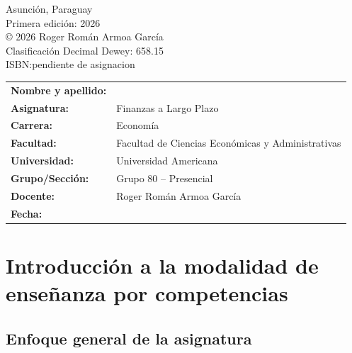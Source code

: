\documentclass[12pt,a4paper]{article}
\begin{document}
Asunción, Paraguay\\
Primera edición: 2026\\[0.2cm]

© 2026 Roger Román Armoa García\\[0.2cm]

Clasificación Decimal Dewey: 658.15\\
ISBN:pendiente de asignacion

\newpage

\tableofcontents
\newpage

\begin{tcolorbox}[
colback=gray!5,
colframe=black,
title=\textbf{Datos de identificación del trabajo},
sharp corners,
boxrule=0.8pt,
width=\textwidth
]

\renewcommand{\arraystretch}{1.8}

\begin{tabular}{p{} p{}}

\textbf{Nombre y apellido:} & \hrulefill \\

\textbf{Asignatura:} &
Finanzas a Largo Plazo \\

\textbf{Carrera:} &
Economía \\

\textbf{Facultad:} &
Facultad de Ciencias Económicas y Administrativas \\

\textbf{Universidad:} &
Universidad Americana \\

\textbf{Grupo/Sección:} &
Grupo 80 -- Presencial \\

\textbf{Docente:} &
Roger Román Armoa García \\

\textbf{Fecha:} &
\hrulefill \\

\end{tabular}

\end{tcolorbox}

\section{Introducción a la modalidad de enseñanza por competencias}

\subsection{Enfoque general de la asignatura}
\end{document}
